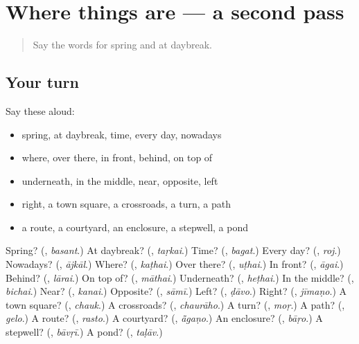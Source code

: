 \section[(dialogue)]{Where things are — a second pass}

\label{lesson:MW-R99-second-pass-where-things-are}



\begin{quote}
Say the words for spring and at daybreak.
\end{quote}

\subsection*{Your turn}
Say these aloud:

\begin{itemize}
\raggedright
  \item spring, at daybreak, time, every day, nowadays
  \item where, over there, in front, behind, on top of
  \item underneath, in the middle, near, opposite, left
  \item right, a town square, a crossroads, a turn, a path
  \item a route, a courtyard, an enclosure, a stepwell, a pond
\end{itemize}

\begin{tcolorbox}[breakable,colback=teal!4,colframe=teal!35!black,title={Before you move on}]
Spring? (\textbf{}, \emph{basant}.) At daybreak? (\textbf{}, \emph{taṛkai}.) Time? (\textbf{}, \emph{bagat}.) Every day? (\textbf{}, \emph{roj}.) Nowadays? (\textbf{}, \emph{ājkāl}.) Where? (\textbf{}, \emph{kaṭhai}.) Over there? (\textbf{}, \emph{uṭhai}.) In front? (\textbf{}, \emph{āgai}.) Behind? (\textbf{}, \emph{lārai}.) On top of? (\textbf{}, \emph{māthai}.) Underneath? (\textbf{}, \emph{heṭhai}.) In the middle? (\textbf{}, \emph{bichai}.) Near? (\textbf{}, \emph{kanai}.) Opposite? (\textbf{}, \emph{sāmī}.) Left? (\textbf{}, \emph{ḍāvo}.) Right? (\textbf{}, \emph{jīmaṇo}.) A town square? (\textbf{}, \emph{chauk}.) A crossroads? (\textbf{}, \emph{chaurāho}.) A turn? (\textbf{}, \emph{moṛ}.) A path? (\textbf{}, \emph{gelo}.) A route? (\textbf{}, \emph{rasto}.) A courtyard? (\textbf{}, \emph{ā̃gaṇo}.) An enclosure? (\textbf{}, \emph{bāṛo}.) A stepwell? (\textbf{}, \emph{bāvṛī}.) A pond? (\textbf{}, \emph{taḷāv}.)
\end{tcolorbox}
